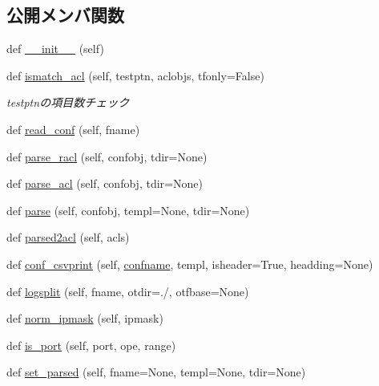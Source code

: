\subsection*{公開メンバ関数}
\begin{DoxyCompactItemize}
\item 
def \mbox{\hyperlink{classCTextFsm_1_1CTextFsm_ae888a03cec9e1bb808d590dc35a9ec6b}{\+\_\+\+\_\+init\+\_\+\+\_\+}} (self)
\item 
def \mbox{\hyperlink{classCTextFsm_1_1CTextFsm_a4248a8d77fdc84c340d4d9d1f5b2790e}{ismatch\+\_\+acl}} (self, testptn, aclobjs, tfonly=False)
\begin{DoxyCompactList}\small\item\em testptnの項目数チェック \end{DoxyCompactList}\item 
def \mbox{\hyperlink{classCTextFsm_1_1CTextFsm_a6043d2a3f369ecd76cdbd636e6c2e035}{read\+\_\+conf}} (self, fname)
\item 
def \mbox{\hyperlink{classCTextFsm_1_1CTextFsm_af4bf12c19b9be216a0a2c8c9ae8f0459}{parse\+\_\+racl}} (self, confobj, tdir=None)
\item 
def \mbox{\hyperlink{classCTextFsm_1_1CTextFsm_aadf519d7468e4b3d2237e3b189d3514c}{parse\+\_\+acl}} (self, confobj, tdir=None)
\item 
def \mbox{\hyperlink{classCTextFsm_1_1CTextFsm_a4d6ef30a6341006802ebacf2d3fa5fc1}{parse}} (self, confobj, templ=None, tdir=None)
\item 
def \mbox{\hyperlink{classCTextFsm_1_1CTextFsm_a8b07c128e0344d13bb92a318a25ab625}{parsed2acl}} (self, acls)
\item 
def \mbox{\hyperlink{classCTextFsm_1_1CTextFsm_a96df9cf7587763ba97a1c1299ff687e4}{conf\+\_\+csvprint}} (self, \mbox{\hyperlink{classCTextFsm_1_1CTextFsm_afaf1b7c90c7fc6173ecc700966132c5c}{confname}}, templ, isheader=True, headding=None)
\item 
def \mbox{\hyperlink{classCTextFsm_1_1CTextFsm_a1ecfc2994e306a0ae4a8670e651f8258}{logsplit}} (self, fname, otdir=\textquotesingle{}./\textquotesingle{}, otfbase=None)
\item 
def \mbox{\hyperlink{classCTextFsm_1_1CTextFsm_a4cc7b93a2ff3e94d32f2387530c89895}{norm\+\_\+ipmask}} (self, ipmask)
\item 
def \mbox{\hyperlink{classCTextFsm_1_1CTextFsm_afba04726b4663e2a7d3ec4d4804af277}{is\+\_\+port}} (self, port, ope, range)
\item 
def \mbox{\hyperlink{classCTextFsm_1_1CTextFsm_ad5accc7ec3e821ff02e9cdf3f06b1355}{set\+\_\+parsed}} (self, fname=None, templ=None, tdir=None)

\end{DoxyCompactItemize}
